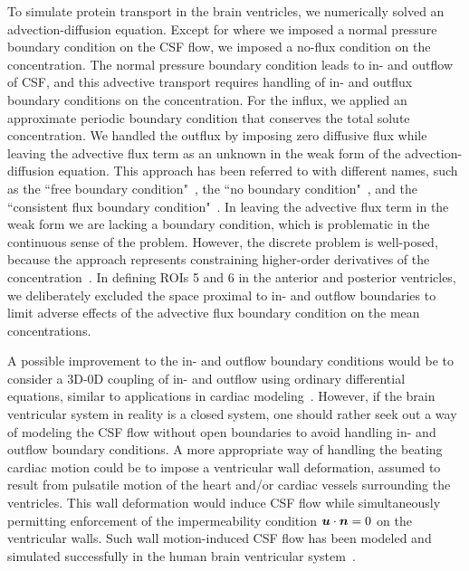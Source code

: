 \documentclass{WileyMSP-template}
\begin{document}
To simulate protein transport in the brain ventricles, we numerically solved
an advection-diffusion equation. Except for where we imposed a normal pressure
boundary condition on the CSF flow,
we imposed a no-flux condition on the concentration. The normal pressure
boundary condition leads to in- and outflow of CSF,
and this advective transport requires handling of in- and outflux boundary conditions on
the concentration. For the influx, we applied an approximate periodic boundary condition
that conserves the total solute concentration.
We handled the outflux by imposing zero diffusive flux while
leaving the advective flux term as an unknown in the weak form
of the advection-diffusion equation. This approach has been referred to with different names,
such as the ``free boundary condition"~\cite{Papanastasiou1992ACondition},
the ``no boundary condition"~\cite{Griffiths1997TheCondition}, and the 
``consistent flux boundary condition"~\cite{Lynch2020NumericalHemodynamics}. 
In leaving the advective flux term in the weak form we are lacking a boundary condition,
which is problematic in the continuous sense of the problem.
However, the discrete problem is well-posed, because the approach represents
constraining higher-order derivatives of the concentration~\cite{Griffiths1997TheCondition}. 
In defining ROIs 5 and 6 in the anterior and posterior ventricles,
we deliberately excluded the space proximal to
in- and outflow boundaries to limit adverse effects of 
the advective flux boundary condition on the mean concentrations. 

A possible improvement to the in- and outflow boundary conditions would be
to consider a 3D-0D coupling of in- and outflow using
ordinary differential equations,
similar to applications in cardiac
modeling~\cite{Brown2024AMechanics, Augustin2021ACirculation}.
However, if the brain ventricular system in reality is a closed system,
one should rather seek out a way of modeling the CSF flow without open boundaries to avoid
handling in- and outflow boundary conditions. A more appropriate way of handling the beating
cardiac motion could be to impose a ventricular wall deformation, assumed to result from pulsatile
motion of the heart and/or cardiac vessels surrounding the ventricles. This wall deformation would
induce CSF flow while simultaneously permitting enforcement of the impermeability condition
$\bm{u}\cdot\bm{n}=0$ on the ventricular walls. Such wall motion-induced CSF flow has been modeled and
simulated successfully in the human brain ventricular system~\cite{Causemann2022HumanFramework,
Kurtcuoglu2005ComputationalSystem, Kurtcuoglu2007ComputationalSylvius, Linninger2005PulsatileBrain}.
\end{document}
